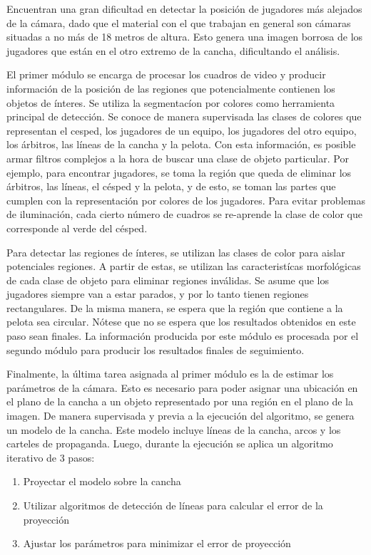 Encuentran una gran dificultad en detectar la posición de jugadores más alejados de la cámara,
dado que el material con el que trabajan en general son cámaras situadas a no más de 18
metros de altura. Esto genera una imagen borrosa de los jugadores que están
en el otro extremo de la cancha, dificultando el análisis.

El primer módulo se encarga de procesar los cuadros de video y producir información
de la posición de las regiones que potencialmente contienen los objetos de ínteres.
Se utiliza la segmentacíon por colores como herramienta principal de detección.
Se conoce de manera supervisada las clases de colores que representan el cesped, los jugadores de un equipo,
los jugadores del otro equipo, los árbitros, las líneas de la cancha y la pelota.
Con esta información, es posible armar filtros complejos a la hora de buscar una clase de objeto particular.
Por ejemplo, para encontrar jugadores, se toma la región que queda de
eliminar los árbitros, las líneas, el césped y la pelota,
y de esto, se toman las partes que cumplen con la representación por colores de los jugadores.
Para evitar problemas de iluminación, cada cierto número de cuadros se re-aprende la clase de color
que corresponde al verde del césped.

Para detectar las regiones de ínteres, se utilizan las clases de color para aislar potenciales regiones.
A partir de estas, se utilizan las caracteristícas morfológicas de cada clase de objeto para eliminar regiones
inválidas. Se asume que los jugadores siempre van a estar parados, y por lo tanto tienen regiones rectangulares.
De la misma manera, se espera que la región que contiene a la pelota sea circular.
Nótese que no se espera que los resultados obtenidos en este paso sean finales.
La información producida por este módulo es procesada por el segundo módulo para producir los resultados finales de
seguimiento.

Finalmente, la última tarea asignada al primer módulo es la de estimar los parámetros de la cámara.
Esto es necesario para poder asignar una ubicación en el plano de la cancha a un objeto representado
por una región en el plano de la imagen.
De manera supervisada y previa a la ejecución del algoritmo, se genera un modelo de la cancha.
Este modelo incluye líneas de la cancha, arcos y los carteles de propaganda.
Luego, durante la ejecución se aplica un algoritmo iterativo de 3 pasos:
\begin{enumerate}
\item Proyectar el modelo sobre la cancha
\item Utilizar algoritmos de detección de líneas para calcular el error de la proyección
\item Ajustar los parámetros para minimizar el error de proyección
\end{enumerate}


